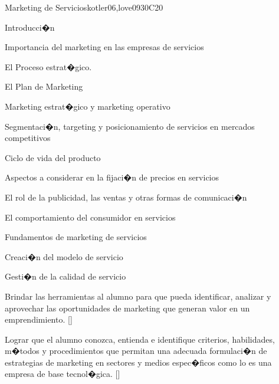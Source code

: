 \begin{syllabus}
\begin{unit}{}{Marketing de Servicios}{kotler06,love09}{30}{C20}
\begin{topics}
      \item Introducci�n
      \item Importancia del marketing en las empresas de servicios
      \item El Proceso estrat�gico.
      \item El Plan de Marketing
      \item Marketing estrat�gico y marketing operativo
      \item Segmentaci�n, targeting y posicionamiento de servicios en mercados competitivos
      \item Ciclo de vida del producto
       \item Aspectos a considerar en la fijaci�n de precios en servicios
       \item El rol de la publicidad, las ventas y otras formas de comunicaci�n
      \item El comportamiento del consumidor en servicios
      \item Fundamentos de marketing de servicios
      \item Creaci�n del modelo de servicio
      \item Gesti�n de la calidad de servicio
   \end{topics}
   \begin{learningoutcomes}
      \item Brindar las herramientas al alumno para que pueda identificar, analizar y aprovechar las oportunidades de marketing que generan valor en un emprendimiento. [\Usage]
      \item Lograr que el alumno conozca, entienda e identifique criterios, habilidades, m�todos y procedimientos que permitan una adecuada formulaci�n de estrategias de marketing en sectores y medios espec�ficos como lo es una empresa de base tecnol�gica. [\Usage]
   \end{learningoutcomes}
\end{unit}


\end{syllabus}
